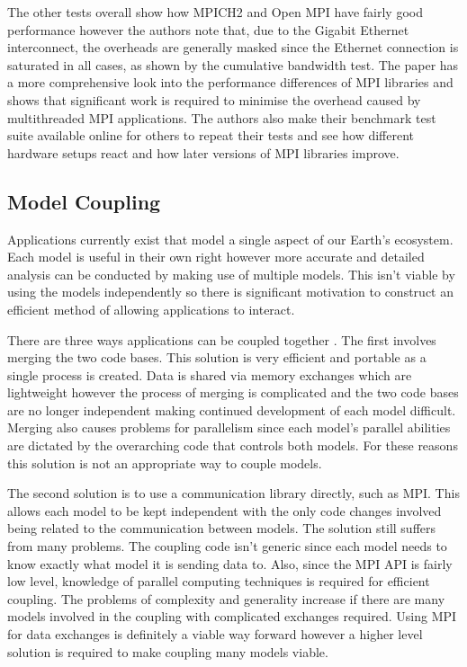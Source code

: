 \documentclass{acm_proc_article-sp}
\begin{document}
The other tests overall show how MPICH2 and Open MPI have fairly good
performance however the authors note that, due to the Gigabit Ethernet
interconnect, the overheads are generally masked since the Ethernet connection
is saturated in all cases, as shown by the cumulative bandwidth test. The paper
has a more comprehensive look into the performance differences of MPI libraries
and shows that significant work is required to minimise the overhead caused by
multithreaded MPI applications. The authors also make their benchmark test suite
available online for others to repeat their tests and see how different hardware
setups react and how later versions of MPI libraries improve.

\subsection*{Model Coupling}

Applications currently exist that model a single aspect of our Earth's
ecosystem. Each model is useful in their own right however more accurate and
detailed analysis can be conducted by making use of multiple models. This isn't
viable by using the models independently so there is significant motivation to
construct an efficient method of allowing applications to interact.

There are three ways applications can be coupled together \cite{Thevenin}. The
first involves merging the two code bases. This solution is very efficient and
portable as a single process is created. Data is shared via memory exchanges
which are lightweight however the process of merging is complicated and the two
code bases are no longer independent making continued development of each model
difficult. Merging also causes problems for parallelism since each model's
parallel abilities are dictated by the overarching code that controls both
models. For these reasons this solution is not an appropriate way to couple
models.

The second solution \cite{Thevenin} is to use a communication library directly,
such as MPI. This allows each model to be kept independent with the only code
changes involved being related to the communication between models. The solution
still suffers from many problems. The coupling code isn't generic since each
model needs to know exactly what model it is sending data to. Also, since the
MPI API is fairly low level, knowledge of parallel computing techniques is
required for efficient coupling. The problems of complexity and generality
increase if there are many models involved in the coupling with complicated
exchanges required. Using MPI for data exchanges is definitely a viable way
forward however a higher level solution is required to make coupling many models
viable.
\end{document}
